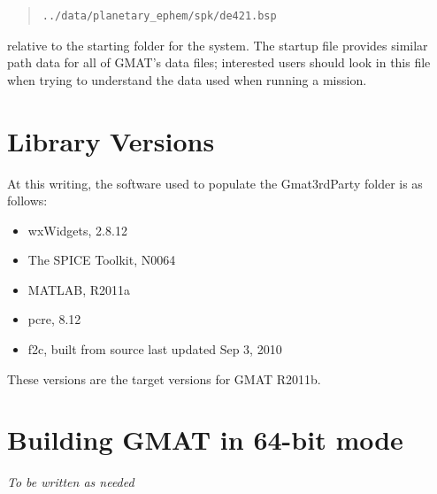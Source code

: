 \documentclass[letterpaper,10pt]{article}%
\begin{document}
\begin{quote}
\begin{verbatim}
../data/planetary_ephem/spk/de421.bsp
\end{verbatim}
\end{quote}

\noindent relative to the starting folder for the system.  The startup file provides similar path data for all of GMAT's data files; interested users should look in this file when trying to understand the data used when running a mission.

\section{\label{sec:ThirdPartyVersions}Library Versions}

At this writing, the software used to populate the Gmat3rdParty folder is as follows:

\begin{itemize}
\item wxWidgets,	2.8.12
\item The SPICE Toolkit, N0064
\item MATLAB, R2011a
\item pcre, 8.12
\item f2c, built from source last updated Sep 3, 2010
\end{itemize}

\noindent These versions are the target versions for GMAT R2011b.

\section{\label{app:64bit}Building GMAT in 64-bit mode}

\textit{To be written as needed}
\end{document}
